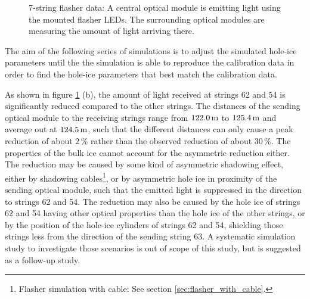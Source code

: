 \begin{figure}[htbp]
  \hfill
  \caption{7-string flasher data: A central optical module is emitting light using the mounted flasher LEDs. The surrounding optical modules are measuring the amount of light arriving there.}
  \label{fig:ea9Zieh0}
\end{figure}

The aim of the following series of simulations is to adjust the
simulated hole-ice parameters until the the simulation is able to
reproduce the calibration data in order to find the hole-ice parameters
that best match the calibration data.


As shown in figure \ref{fig:ea9Zieh0} (b), the amount of light received
at strings 62 and 54 is significantly reduced compared to the other
strings. The distances of the sending optical module to the receiving
strings range from \(122.0\text{\,m}\) to \(125.4\text{\,m}\) and average out at
\(124.5\text{\,m}\), such that the different distances can only cause a peak
reduction of about \(2\,\%\) rather than the observed reduction of about
\(30\,\%\). The properties of the bulk ice cannot account for the
asymmetric reduction either. The reduction may be caused by some kind of
asymmetric shadowing effect, either by shadowing
cables\footnote{Flasher simulation with cable: See section \ref{sec:flasher_with_cable}.},
or by asymmetric hole ice in proximity of the sending optical module,
such that the emitted light is suppressed in the direction to strings 62
and 54. The reduction may also be caused by the hole ice of strings 62
and 54 having other optical properties than the hole ice of the other
strings, or by the position of the hole-ice cylinders of strings 62 and
54, shielding those strings less from the direction of the sending
string 63. A systematic simulation study to investigate those scenarios
is out of scope of this study, but is suggested as a follow-up
study.\followup

